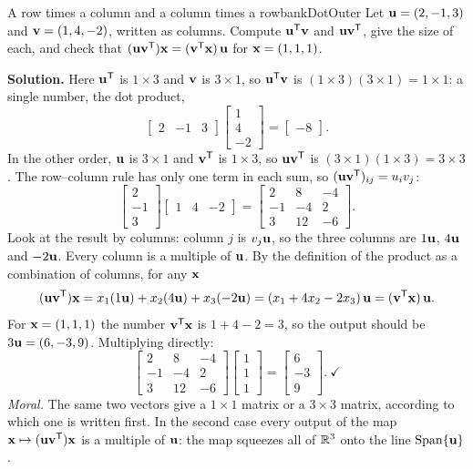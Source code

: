 \documentclass[11pt]{article}
\begin{document}
\begin{exmp}{A row times a column and a column times a row}{bankDotOuter}
Let $\mathbf{u}=(2,-1,3)$ and $\mathbf{v}=(1,4,-2)$, written as columns. Compute $\mathbf{u}^{\mathsf T}\mathbf{v}$ and $\mathbf{u}\mathbf{v}^{\mathsf T}$, give the size of each, and check that $(\mathbf{u}\mathbf{v}^{\mathsf T})\mathbf{x}=(\mathbf{v}^{\mathsf T}\mathbf{x})\,\mathbf{u}$ for $\mathbf{x}=(1,1,1)$.

\textbf{Solution.} Here $\mathbf{u}^{\mathsf T}$ is $1\times3$ and $\mathbf{v}$ is $3\times1$, so $\mathbf{u}^{\mathsf T}\mathbf{v}$ is $(1\times3)(3\times1)=1\times1$: a single number, the dot product,
\[
\begin{bmatrix}2&-1&3\end{bmatrix}\begin{bmatrix}1\\4\\-2\end{bmatrix}=\begin{bmatrix}-8\end{bmatrix}.
\]
In the other order, $\mathbf{u}$ is $3\times1$ and $\mathbf{v}^{\mathsf T}$ is $1\times3$, so $\mathbf{u}\mathbf{v}^{\mathsf T}$ is $(3\times1)(1\times3)=3\times3$. The row--column rule has only one term in each sum, so $(\mathbf{u}\mathbf{v}^{\mathsf T})_{ij}=u_iv_j$:
\[
\begin{bmatrix}2\\-1\\3\end{bmatrix}\begin{bmatrix}1&4&-2\end{bmatrix}=\begin{bmatrix}2&8&-4\\-1&-4&2\\3&12&-6\end{bmatrix}.
\]
Look at the result by columns: column $j$ is $v_j\mathbf{u}$, so the three columns are $1\mathbf{u}$, $4\mathbf{u}$ and $-2\mathbf{u}$. Every column is a multiple of $\mathbf{u}$. By the definition of the product as a combination of columns, for any $\mathbf{x}$
\[
(\mathbf{u}\mathbf{v}^{\mathsf T})\mathbf{x}=x_1(1\mathbf{u})+x_2(4\mathbf{u})+x_3(-2\mathbf{u})=(x_1+4x_2-2x_3)\,\mathbf{u}=(\mathbf{v}^{\mathsf T}\mathbf{x})\,\mathbf{u}.
\]
For $\mathbf{x}=(1,1,1)$ the number $\mathbf{v}^{\mathsf T}\mathbf{x}$ is $1+4-2=3$, so the output should be $3\mathbf{u}=(6,-3,9)$. Multiplying directly:
\[
\begin{bmatrix}2&8&-4\\-1&-4&2\\3&12&-6\end{bmatrix}\begin{bmatrix}1\\1\\1\end{bmatrix}=\begin{bmatrix}6\\-3\\9\end{bmatrix}.\ \checkmark
\]
\emph{Moral.} The same two vectors give a $1\times1$ matrix or a $3\times3$ matrix, according to which one is written first. In the second case every output of the map $\mathbf{x}\mapsto(\mathbf{u}\mathbf{v}^{\mathsf T})\mathbf{x}$ is a multiple of $\mathbf{u}$: the map squeezes all of $\mathbb{R}^3$ onto the line $\operatorname{Span}\{\mathbf{u}\}$.
\end{exmp}
\end{document}
